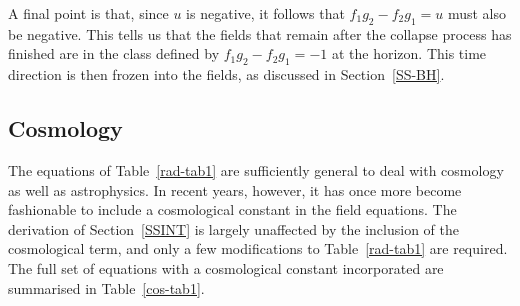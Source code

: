 \documentclass[a4paper]{article}
\numberwithin{equation}{section}
\begin{document}
A final point is that, since $u$ is negative, it follows that
$f_1g_2-f_2g_1=u$ must also be negative.  This tells us that the
fields that remain after the collapse process has finished are in the
class defined by $f_1g_2-f_2g_1=-1$ at the horizon.  This time
direction is then frozen into the fields, as discussed in
Section~\ref{SS-BH}.




\subsection{Cosmology}
\label{SS-COS}

The equations of Table~\ref{rad-tab1} are sufficiently general to deal
with cosmology as well as astrophysics.  In recent years, however, it
has once more become fashionable to include a cosmological constant in
the field equations.  The derivation of Section~\ref{SSINT} is largely
unaffected by the inclusion of the cosmological term, and only a few
modifications to Table~\ref{rad-tab1} are required.  The full set of
equations with a cosmological constant incorporated are summarised in
Table~\ref{cos-tab1}.
\end{document}
